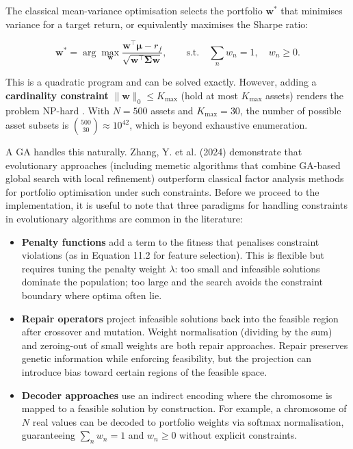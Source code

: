 The classical \cite{markowitz1952portfolio} mean-variance optimisation selects the portfolio $\mathbf{w}^*$ that minimises variance for a target return, or equivalently maximises the Sharpe ratio:

\begin{equation}
\mathbf{w}^* = \arg\max_{\mathbf{w}} \frac{\mathbf{w}^\top \boldsymbol{\mu} - r_f}{\sqrt{\mathbf{w}^\top \boldsymbol{\Sigma} \mathbf{w}}}, \qquad \text{s.t.} \quad \sum_n w_n = 1, \quad w_n \geq 0. \tag{11.5}
\end{equation}

This is a quadratic program and can be solved exactly. However, adding a \textbf{cardinality constraint} $\|\mathbf{w}\|_0 \leq K_{\max}$ (hold at most $K_{\max}$ assets) renders the problem NP-hard \citep{Chang2000}. With $N = 500$ assets and $K_{\max} = 30$, the number of possible asset subsets is $\binom{500}{30} \approx 10^{42}$, which is beyond exhaustive enumeration.

A GA handles this naturally. Zhang, Y. et al. (2024) demonstrate that evolutionary approaches (including memetic algorithms that combine GA-based global search with local refinement) outperform classical factor analysis methods for portfolio optimisation under such constraints. Before we proceed to the implementation, it is useful to note that three paradigms for handling constraints in evolutionary algorithms are common in the literature:

\begin{itemize}
\item \textbf{Penalty functions} add a term to the fitness that penalises constraint violations (as in Equation 11.2 for feature selection). This is flexible but requires tuning the penalty weight $\lambda$: too small and infeasible solutions dominate the population; too large and the search avoids the constraint boundary where optima often lie.
\item \textbf{Repair operators} project infeasible solutions back into the feasible region after crossover and mutation. Weight normalisation (dividing by the sum) and zeroing-out of small weights are both repair approaches. Repair preserves genetic information while enforcing feasibility, but the projection can introduce bias toward certain regions of the feasible space.
\item \textbf{Decoder approaches} use an indirect encoding where the chromosome is mapped to a feasible solution by construction. For example, a chromosome of $N$ real values can be decoded to portfolio weights via softmax normalisation, guaranteeing $\sum_n w_n = 1$ and $w_n \geq 0$ without explicit constraints.
\end{itemize}

